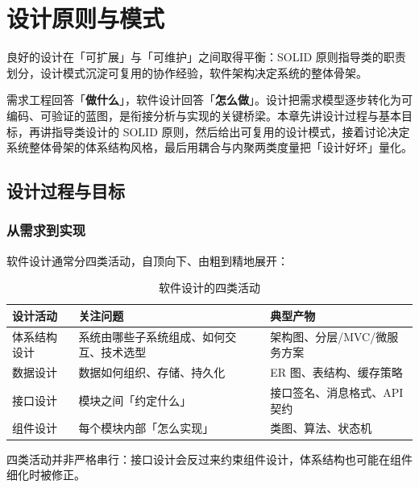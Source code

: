 \clearpage
\begingroup
\let\clearpage\relax
\let\cleardoublepage\relax
\vspace*{\fill}
\chapter{设计原则与模式}
\begin{center}
良好的设计在「可扩展」与「可维护」之间取得平衡：SOLID 原则指导类的职责划分，设计模式沉淀可复用的协作经验，软件架构决定系统的整体骨架。
\end{center}
\vspace*{\fill}
\endgroup
\clearpage

需求工程回答「\textbf{做什么}」，软件设计回答「\textbf{怎么做}」。设计把需求模型逐步转化为可编码、可验证的蓝图，是衔接分析与实现的关键桥梁。本章先讲设计过程与基本目标，再讲指导类设计的 SOLID 原则，然后给出可复用的设计模式，接着讨论决定系统整体骨架的体系结构风格，最后用耦合与内聚两类度量把「设计好坏」量化。

\section{设计过程与目标}

\subsection{从需求到实现}

软件设计通常分四类活动，自顶向下、由粗到精地展开：

\begin{table}[H]
\centering
\caption{软件设计的四类活动}
\begin{tabulary}{\textwidth}{LLL}
\toprule
设计活动 & 关注问题 & 典型产物 \\
\midrule
体系结构设计 & 系统由哪些子系统组成、如何交互、技术选型 & 架构图、分层/MVC/微服务方案 \\
数据设计 & 数据如何组织、存储、持久化 & ER 图、表结构、缓存策略 \\
接口设计 & 模块之间「约定什么」& 接口签名、消息格式、API 契约 \\
组件设计 & 每个模块内部「怎么实现」& 类图、算法、状态机 \\
\bottomrule
\end{tabulary}
\end{table}

四类活动并非严格串行：接口设计会反过来约束组件设计，体系结构也可能在组件细化时被修正。

